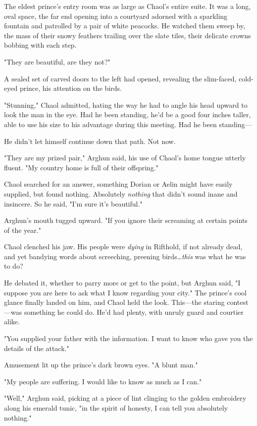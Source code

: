 The eldest prince's entry room was as large as Chaol's entire suite.
It was a long, oval space, the far end opening into a courtyard adorned with a sparkling fountain and patrolled by a pair of white peacocks.
He watched them sweep by, the mass of their snowy feathers trailing over the slate tiles, their delicate crowns bobbing with each step.

"They are beautiful, are they not?"

A sealed set of carved doors to the left had opened, revealing the slim-faced, cold-eyed prince, his attention on the birds.

"Stunning," Chaol admitted, hating the way he had to angle his head upward to look the man in the eye.
Had he been standing, he'd be a good four inches taller, able to use his size to his advantage during this meeting.
Had he been standing---

He didn't let himself continue down that path.
Not now.

"They are my prized pair," Arghun said, his use of Chaol's home tongue utterly fluent.
"My country home is full of their offspring."

Chaol searched for an answer, something Dorian or Aelin might have easily supplied, but found nothing.
Absolutely \emph{nothing} that didn't sound inane and insincere.
So he said, "I'm sure it's beautiful."

Arghun's mouth tugged upward.
"If you ignore their screaming at certain points of the year."

Chaol clenched his jaw.
His people were \emph{dying} in Rifthold, if not already dead, and yet bandying words about screeching, preening birds\ldots \emph{this} was what he was to do?

He debated it, whether to parry more or get to the point, but Arghun said, "I suppose you are here to ask what I know regarding your city."
The prince's cool glance finally landed on him, and Chaol held the look.
This---the staring contest ---was something he could do.
He'd had plenty, with unruly guard and courtier alike.

"You supplied your father with the information.
I want to know who gave you the details of the attack."

Amusement lit up the prince's dark brown eyes.
"A blunt man."

"My people are suffering.
I would like to know as much as I can."

"Well," Arghun said, picking at a piece of lint clinging to the golden embroidery along his emerald tunic, "in the spirit of honesty, I can tell you absolutely nothing."

